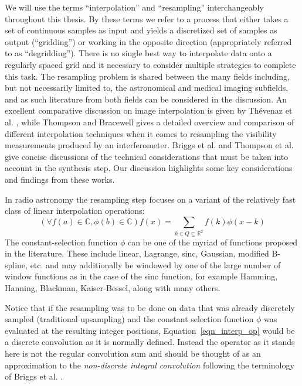  We will use the terms ``interpolation'' and ``resampling'' interchangeably throughout this thesis. By these terms we refer to a process that 
 either takes a set of continuous samples as input and yields a discretized set of samples as output (``gridding'') or working in the opposite 
 direction (appropriately referred to as ``degridding''). There is no single best way to interpolate data onto a regularly spaced grid 
 and it necessary to consider multiple strategies to complete this task. The resampling problem is shared between the many fields including, 
 but not necessarily limited to, the astronomical and medical imaging subfields, and as such literature from both fields can be considered in 
 the discussion. An excellent comparative discussion on image interpolation is given by Th\'evenaz et al. \cite{thevenaz2000image}, while
 Thompson and Bracewell \cite{thompson1974interpolation} gives a detailed overview and comparison of different interpolation techniques when it comes to 
 resampling the visibility measurements produced by an interferometer. Briggs et al. \cite[Lecture 7]{taylor1999synthesis} and 
 Thompson et al. \cite[p. 387-399]{thompson2008interferometry} give concise discussions of the technical considerations that must be taken into 
 account in the synthesis step. Our discussion highlights some key considerations and findings from these works.
 
 In radio astronomy the resampling step focuses on a variant of the relatively fast class of linear interpolation operations:
 \begin{equation}
   \label{eqn_interp_op}
   (\forall f(a)\in\mathbb{C},\phi(b)\in\mathbb{C})f(x) = \sum_{k\in Q\subseteq\mathbb{R}^2}{f(k)\phi(x-k)}
 \end{equation}
 The constant-selection function $\phi$ can be one of the myriad of functions proposed in the literature. These include linear, Lagrange, sinc, 
 Gaussian, modified B-spline, etc. and may additionally be windowed by one of the large number of window functions as in the case of the sinc function, 
 for example Hamming, Hanning, Blackman, Kaiser-Bessel, along with many others.
 
 Notice that if the resampling was to be done on data that was already discretely sampled (traditional upsampling) and the constant 
 selection function $\phi$ was evaluated at the resulting integer positions, Equation~\ref{eqn_interp_op} would be a discrete convolution as it is
 normally defined. Instead the operator as it stands here is not the regular convolution sum and should be thought of as an approximation to the 
 \emph{non-discrete integral convolution} following the terminology of Briggs et al. \cite[Lecture 7]{taylor1999synthesis}. 
 

